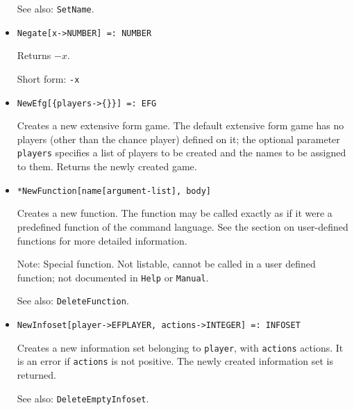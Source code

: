 \begin{itemize}
{\it for} {\tt T = ACTION, EFG, EFOUTCOME, EFPLAYER, INFOSET,
NFG, NFOUTCOME, NFPLAYER, NODE, STRATEGY} 
\bd
Returns the name of \verb+x+.  The name of a null object is defined
to be the empty string.
\item
[See also:] \verb+SetName+.
\ed

\item{} 
\protect \large \begin{verbatim}
Negate[x->NUMBER] =: NUMBER 
\end{verbatim} \normalsize

\bd
Returns $-x$.
\item
[Short form:] \verb+-x+
\ed

\item{}
\protect \large \begin{verbatim} 
NewEfg[{players->{}}] =: EFG 
\end{verbatim}\normalsize

\bd
Creates a new extensive form game.  The default extensive form
game has no players (other than the chance player) defined on it; the
optional parameter \verb+players+ specifies a list of players to be
created and the names to be assigned to them.  Returns the newly created game.
\ed

\item{}   
\protect \large \begin{verbatim}
*NewFunction[name[argument-list], body]
\end{verbatim}\normalsize

\bd
Creates a new function.  The function may be called exactly
as if it were a predefined function of the command language.  See the
section on user-defined functions for more detailed information.
\item [Note:]  Special function.  Not listable, cannot be called in a
user defined function; not documented in \verb+Help+ or \verb+Manual+.  
\item [See also:] \verb+DeleteFunction+.
\ed

\item{}
\protect \large \begin{verbatim} 
NewInfoset[player->EFPLAYER, actions->INTEGER] =: INFOSET 
\end{verbatim}\normalsize

\bd
Creates a new information set belonging to \verb+player+, with
\verb+actions+ actions.  It is an error if \verb+actions+ is not
positive.  The newly created information set is returned.
\item [See also:] \verb+DeleteEmptyInfoset+.
\ed


\end{itemize}
